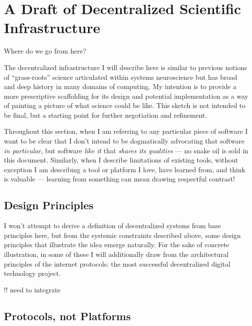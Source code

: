 \documentclass[10pt]{tufte-book}
\begin{document}
\section{A Draft of Decentralized Scientific
Infrastructure}



 Where do we go from here?

The decentralized infrastructure I will describe here is similar to
previous notions of ``grass-roots'' science articulated within systems
neuroscience \citep{mainenBetterWayCrack2016}  but has broad and
deep history in many domains of computing. My intention is to provide a
more prescriptive scaffolding for its design and potential
implementation as a way of painting a picture of what science could be
like. This sketch is not intended to be final, but a starting point for
further negotiation and refinement.

Throughout this section, when I am referring to any particular piece of
software I want to be clear that I don't intend to be dogmatically
advocating that software \emph{in particular}, but software \emph{like
it} that \emph{shares its qualities} --- no snake oil is sold in this
document. Similarly, when I describe limitations of existing tools,
without exception I am describing a tool or platform I love, have
learned from, and think is valuable --- learning from something can mean
drawing respectful contrast!


\subsection{Design Principles}

I won't attempt to derive a definition of decentralized systems from
base principles here, but from the systemic constraints described above,
some design principles that illustrate the idea emerge naturally. For
the sake of concrete illustration, in some of these I will additionally
draw from the architectural principles of the internet protocols: the
most successful decentralized digital technology project.

!! need to integrate \citep{larsenPoliticalNatureTCP2012} 


\subsection{Protocols, not Platforms}
\end{document}
